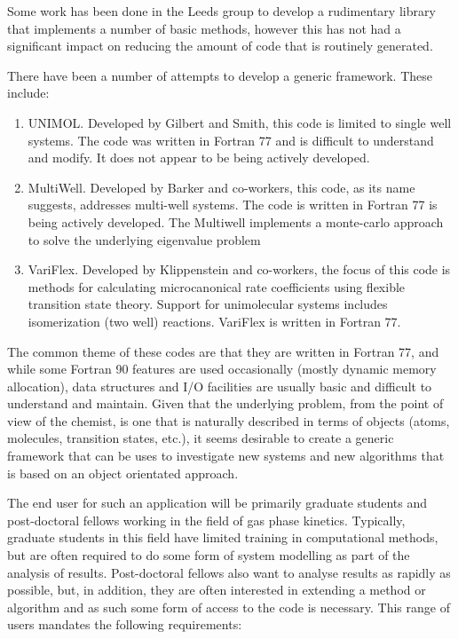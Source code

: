 Some work has been done in the Leeds group to develop a rudimentary library that implements a number of basic methods, however this has not had a significant impact on reducing the amount of code that is routinely generated.

There have been a number of attempts to develop a generic framework. These include:

\begin{enumerate}
  \item  UNIMOL. Developed by Gilbert and Smith, this code is limited to single well systems. The code was written in Fortran 77 and is difficult to understand and modify. It does not appear to be being actively developed.
  \item  MultiWell. Developed by Barker and co-workers, this code, as its name suggests, addresses multi-well systems. The code is written in Fortran 77 is being actively developed. The Multiwell implements a monte-carlo approach to solve the underlying eigenvalue problem
  \item  VariFlex. Developed by Klippenstein and co-workers, the focus of this code is methods for calculating microcanonical rate coefficients using flexible transition state theory. Support for unimolecular systems includes isomerization (two well) reactions. VariFlex is written in Fortran 77. 

\end{enumerate}

The common theme of these codes are that they are written in Fortran 77, and while some Fortran 90 features are used occasionally (mostly dynamic memory allocation), data structures and I/O facilities are usually basic and difficult to understand and maintain.  Given that the underlying problem, from the point of view of the chemist, is one that is naturally described in terms of objects (atoms, molecules, transition states, etc.), it seems desirable to create a generic framework that can be uses to investigate new systems and new algorithms that is based on an object orientated approach.

The end user for such an application will be primarily graduate students and post-doctoral fellows working in the field of gas phase kinetics. Typically, graduate students in this field have limited training in computational methods, but are often required to do some form of system modelling as part of the analysis of results. Post-doctoral fellows also want to analyse results as rapidly as possible, but, in addition, they are often interested in extending a method or algorithm and as such some form of access to the code is necessary. This range of users mandates the following requirements:


